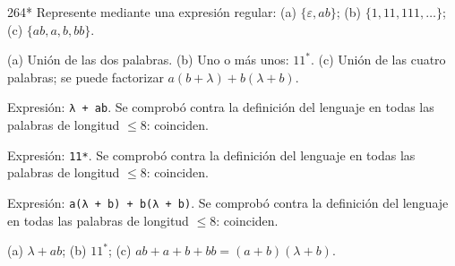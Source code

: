 \documentclass[11pt]{article}
\begin{document}
\begin{ejercicio}{264}{*}
Represente mediante una expresión regular: (a) $\{\varepsilon, ab\}$; (b) $\{1, 11, 111, \ldots\}$; (c) $\{ab, a, b, bb\}$.
\end{ejercicio}
\proc (a) Unión de las dos palabras. (b) Uno o más unos: $11^*$. (c) Unión de las cuatro palabras; se puede factorizar $a(b + \lambda) + b(\lambda + b)$.\par Expresión: \texttt{λ + ab}. Se comprobó contra la definición del lenguaje en todas las palabras de longitud $\le 8$: coinciden.
\par Expresión: \texttt{11*}. Se comprobó contra la definición del lenguaje en todas las palabras de longitud $\le 8$: coinciden.
\par Expresión: \texttt{a(λ + b) + b(λ + b)}. Se comprobó contra la definición del lenguaje en todas las palabras de longitud $\le 8$: coinciden.

\resp (a) $\lambda + ab$; (b) $11^*$; (c) $ab + a + b + bb = (a + b)(\lambda + b)$.
\end{document}
